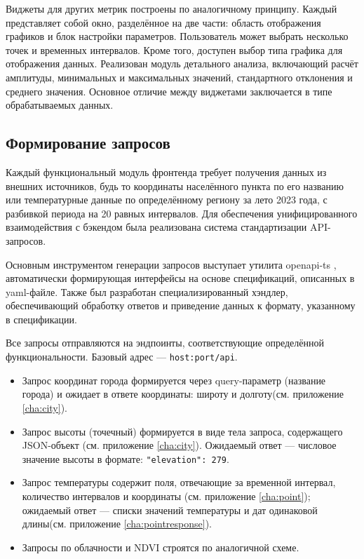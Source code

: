 Виджеты для других метрик построены по аналогичному принципу. Каждый представляет собой окно, разделённое на две части: область отображения графиков и блок настройки параметров. Пользователь может выбрать несколько точек и временных интервалов. Кроме того, доступен выбор типа графика для отображения данных. Реализован модуль детального анализа, включающий расчёт амплитуды, минимальных и максимальных значений, стандартного отклонения и среднего значения. Основное отличие между виджетами заключается в типе обрабатываемых данных.

\subsection*{Формирование запросов}

Каждый функциональный модуль фронтенда требует получения данных из внешних источников, будь то координаты населённого пункта по его названию или температурные данные по определённому региону за лето 2023 года, с разбивкой периода на 20 равных интервалов. Для обеспечения унифицированного взаимодействия с бэкендом была реализована система стандартизации API-запросов.

Основным инструментом генерации запросов выступает утилита openapi-ts \cite{OpenAPI_TS2023}, автоматически формирующая интерфейсы на основе спецификаций, описанных в yaml-файле. Также был разработан специализированный хэндлер, обеспечивающий обработку ответов и приведение данных к формату, указанному в спецификации.

Все запросы отправляются на эндпоинты, соответствующие определённой функциональности. Базовый адрес — \texttt{host:port/api}.

\begin{itemize}
	\item Запрос координат города формируется через query-параметр (название города) и ожидает в ответе координаты: широту и долготу(см. приложение \ref{cha:city}).
	
	\item Запрос высоты (точечный) формируется в виде тела запроса, содержащего JSON-объект (см. приложение \ref{cha:city}). Ожидаемый ответ — числовое значение высоты в формате: \texttt{"elevation": 279}.
	
	\item Запрос температуры содержит поля, отвечающие за временной интервал, количество интервалов и координаты (см. приложение \ref{cha:point}); ожидаемый ответ — списки значений температуры и дат одинаковой длины(см. приложение \ref{cha:pointresponse}). 
	
	\item Запросы по облачности и NDVI строятся по аналогичной схеме.
\end{itemize}

